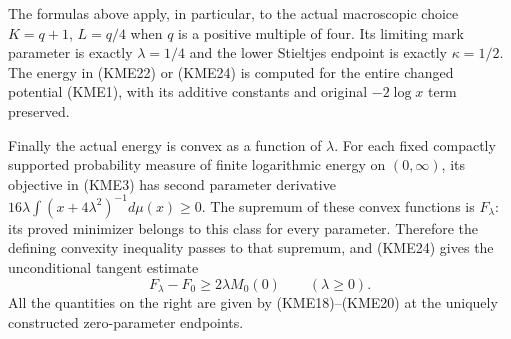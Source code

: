The formulas above apply, in particular, to the actual macroscopic
choice $K=q+1$, $L=q/4$ when $q$ is a positive multiple of four.
Its limiting mark parameter is exactly $\lambda=1/4$ and the lower
Stieltjes endpoint is exactly $\kappa=1/2$. The energy in (KME22) or (KME24)
is computed for the entire changed potential (KME1), with its additive
constants and original $-2\log x$ term preserved.

Finally the actual energy is convex as a function of $\lambda$.
For each fixed compactly supported probability measure of finite
logarithmic energy on $(0,\infty)$,
its objective in (KME3) has second parameter derivative
$16\lambda\int(x+4\lambda^2)^{-1}d\mu(x)\geq0$.
The supremum of these convex functions is $F_\lambda$: its proved
minimizer belongs to this class for every parameter. Therefore the
defining convexity inequality passes to that supremum, and (KME24)
gives the unconditional tangent estimate
\begin{equation}\tag{KME25}
 F_\lambda-F_0\geq2\lambda M_0(0)\qquad(\lambda\geq0).
\end{equation}
All the quantities on the right are given by (KME18)--(KME20) at the
uniquely constructed zero-parameter endpoints.
